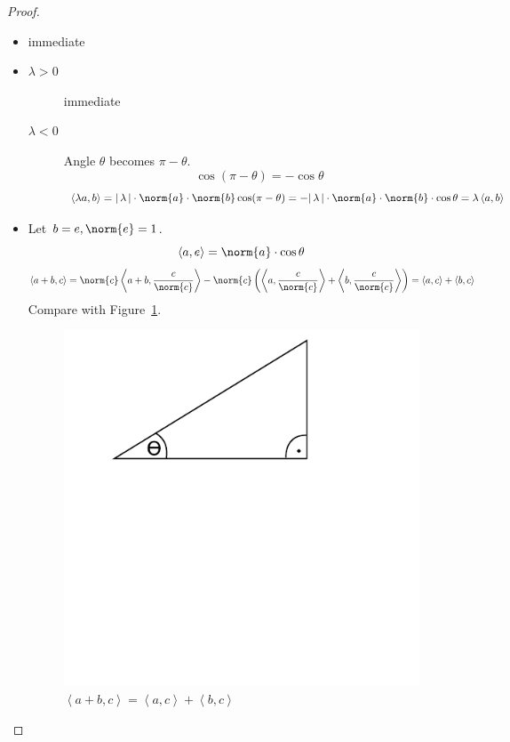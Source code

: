 \documentclass[a4paper,landscape,twocolumn]{article}
\newcommand\abs[1]{|\,#1\,|}
\newcommand\functional[1]{\left\langle{#1}\right\rangle}
\DeclarePairedDelimiter\norm\lVert\rVert
\begin{document}
\begin{proof}
  \begin{itemize}
    \item immediate
    \item
      \begin{description}
        \item[$\lambda > 0$]
          immediate
        \item[$\lambda < 0$]
          Angle $\theta$ becomes $\pi - \theta$.
          \[ \cos(\pi - \theta) = -\cos{\theta} \]
          \[ \functional{\lambda a,b} = \abs{\lambda} \cdot \norm{a} \cdot \norm{b} \cos(\pi - \theta) = -\abs{\lambda} \cdot \norm{a} \cdot \norm{b} \cdot \cos{\theta} = \lambda \functional{a,b} \]
      \end{description}
    \item
      Let $b = e, \norm{e} = 1$.
      \[ \functional{a,e} = \norm{a} \cdot \cos{\theta} \]
      \[ \functional{a+b,c} = \norm{c} \functional{a+b,\frac{c}{\norm{c}}} - \norm{c} \left(\functional{a,\frac{c}{\norm{c}}} + \functional{b,\frac{c}{\norm{c}}}\right) = \functional{a,c} + \functional{b,c} \]
      Compare with Figure~\ref{img:383}.
      \begin{figure}[!h]
        \begin{center}
          \includegraphics{img/8_3_3.pdf}
          \caption{$\functional{a+b,c} = \functional{a,c} + \functional{b,c}$}
          \label{img:383}
        \end{center}
      \end{figure}
  \end{itemize}
\end{proof}
\end{document}
